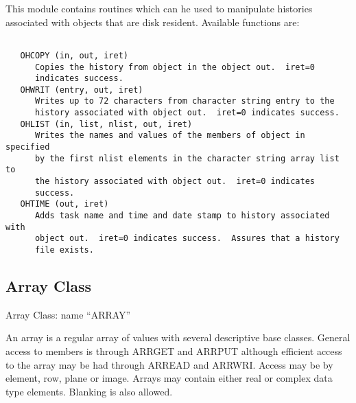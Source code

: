 This module contains routines which can he used to manipulate
histories associated with objects that are disk resident.
Available functions are:
{\small\begin{verbatim}

   OHCOPY (in, out, iret)
      Copies the history from object in the object out.  iret=0
      indicates success.
   OHWRIT (entry, out, iret)
      Writes up to 72 characters from character string entry to the
      history associated with object out.  iret=0 indicates success.
   OHLIST (in, list, nlist, out, iret)
      Writes the names and values of the members of object in specified
      by the first nlist elements in the character string array list to
      the history associated with object out.  iret=0 indicates
      success.
   OHTIME (out, iret)
      Adds task name and time and date stamp to history associated with
      object out.  iret=0 indicates success.  Assures that a history
      file exists.

\end{verbatim}}

\subsection{Array Class}
   Array Class:  name ``ARRAY''

An array is a regular array of values with several descriptive base
classes. General access to members is through ARRGET and ARRPUT
although efficient access to the array may be had through ARREAD and
ARRWRI.  Access may be by element, row, plane or image.  Arrays may
contain either real or complex data type elements.  Blanking is also
allowed.

